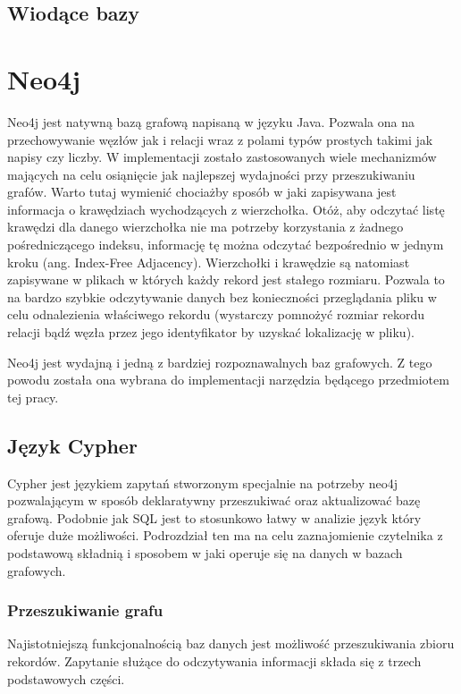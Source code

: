 \documentclass[brudnopis]{xmgr}
\begin{document}
\section{Wiodące bazy}

\chapter{Neo4j}

Neo4j jest natywną bazą grafową napisaną w języku Java. Pozwala ona na przechowywanie węzłów jak i relacji wraz z polami typów prostych takimi jak napisy czy liczby. W implementacji zostało zastosowanych wiele mechanizmów mających na celu osiąnięcie jak najlepszej wydajności przy przeszukiwaniu grafów. Warto tutaj wymienić chociażby sposób w jaki zapisywana jest informacja o krawędziach wychodzących z wierzchołka. Otóż, aby odczytać listę krawędzi dla danego wierzchołka nie ma potrzeby korzystania z żadnego pośredniczącego indeksu, informację tę można odczytać bezpośrednio w jednym kroku (ang. Index-Free Adjacency). Wierzchołki i krawędzie są natomiast zapisywane w plikach w których każdy rekord jest stałego rozmiaru. Pozwala to na bardzo szybkie odczytywanie danych bez konieczności przeglądania pliku w celu odnalezienia właściwego rekordu (wystarczy pomnożyć rozmiar rekordu relacji bądź węzła przez jego identyfikator by uzyskać lokalizację w pliku).

Neo4j jest wydajną i jedną z bardziej rozpoznawalnych baz grafowych. Z tego powodu została ona wybrana do implementacji narzędzia będącego przedmiotem tej pracy.

\section{Język Cypher}
Cypher jest językiem zapytań stworzonym specjalnie na potrzeby neo4j pozwalającym w sposób deklaratywny przeszukiwać oraz aktualizować bazę grafową. Podobnie jak SQL jest to stosunkowo łatwy w analizie język który oferuje duże możliwości. Podrozdział ten ma na celu zaznajomienie czytelnika z podstawową składnią i sposobem w jaki operuje się na danych w bazach grafowych.

\subsection{Przeszukiwanie grafu}

Najistotniejszą funkcjonalnością baz danych jest możliwość przeszukiwania zbioru rekordów. Zapytanie służące do odczytywania informacji składa się z trzech podstawowych części.
\end{document}
